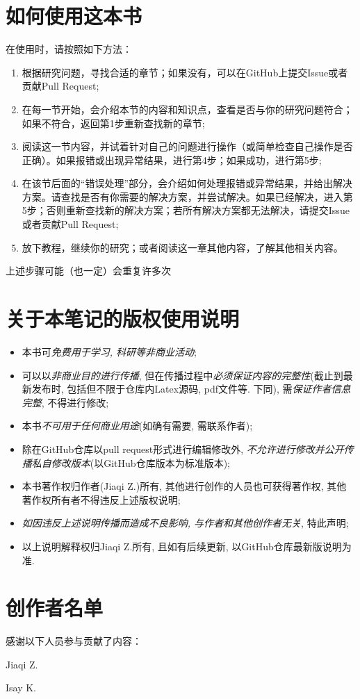 \section*{如何使用这本书}

在使用时，请按照如下方法：

\begin{enumerate}
    \item 根据研究问题，寻找合适的章节；如果没有，可以在GitHub上提交Issue或者贡献Pull Request;
    \item 在每一节开始，会介绍本节的内容和知识点，查看是否与你的研究问题符合；如果不符合，返回第1步重新查找新的章节;
    \item 阅读这一节内容，并试着针对自己的问题进行操作（或简单检查自己操作是否正确）。如果报错或出现异常结果，进行第4步；如果成功，进行第5步;
    \item 在该节后面的“错误处理”部分，会介绍如何处理报错或异常结果，并给出解决方案。请查找是否有你需要的解决方案，并尝试解决。如果已经解决，进入第5步；否则重新查找新的解决方案；若所有解决方案都无法解决，请提交Issue或者贡献Pull Request;
    \item 放下教程，继续你的研究；或者阅读这一章其他内容，了解其他相关内容。
\end{enumerate}

上述步骤可能（也一定）会重复许多次

\section*{关于本笔记的版权使用说明}

\begin{itemize}
    \item 本书可\emph{免费用于学习, 科研等非商业活动};
    \item 可以以\emph{非商业目的进行传播}, 但在传播过程中\emph{必须保证内容的完整性}(截止到最新发布时, 包括但不限于仓库内Latex源码, pdf文件等. 下同), 需\emph{保证作者信息完整}, 不得进行修改;
    \item 本书\emph{不可用于任何商业用途}(如确有需要, 需联系作者);
    \item 除在GitHub仓库以pull request形式进行编辑修改外, \emph{不允许进行修改并公开传播私自修改版本}(以GitHub仓库版本为标准版本);
    \item 本书著作权归作者(Jiaqi Z.)所有, 其他进行创作的人员也可获得著作权, 其他著作权所有者不得违反上述版权说明;
    \item \emph{如因违反上述说明传播而造成不良影响, 与作者和其他创作者无关}, 特此声明;
    \item 以上说明解释权归Jiaqi Z.所有, 且如有后续更新, 以GitHub仓库最新版说明为准.
\end{itemize}

\section*{创作者名单}

感谢以下人员参与贡献了内容：

Jiaqi Z.

Isay K.